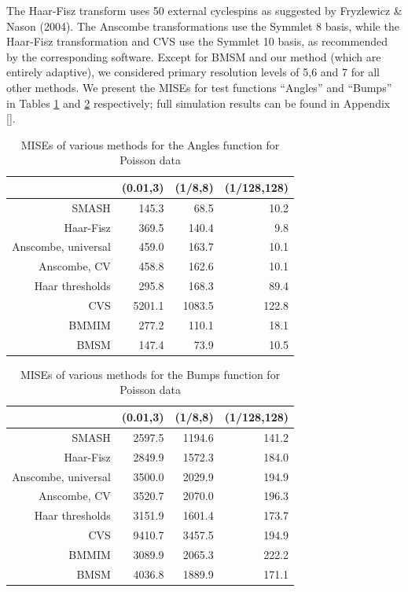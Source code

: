 \documentclass[12pt]{article}
\begin{document}
The Haar-Fisz transform uses 50 external cyclespins as suggested by Fryzlewicz \& Nason (2004). The Anscombe transformations use the Symmlet 8 basis, while the Haar-Fisz transformation and CVS use the Symmlet 10 basis, as recommended by the corresponding software. Except for BMSM and our method (which are entirely adaptive), we considered primary resolution levels of 5,6 and 7 for all other methods. We present the MISEs for test functions ``Angles'' and ``Bumps'' in Tables \ref{table:pois_angles} and \ref{table:pois_bumps} respectively; full simulation results can be found in Appendix \ref{}.\bigskip\\
\begin{table}[ht]
\centering
\begin{tabular}{rrrr}
  \hline
 & (0.01,3) & (1/8,8) & (1/128,128) \\
  \hline
SMASH & 145.3 & 68.5 & 10.2 \\
  Haar-Fisz & 369.5 & 140.4 & 9.8 \\
  Anscombe, universal & 459.0 & 163.7 & 10.1 \\
  Anscombe, CV & 458.8 & 162.6 & 10.1 \\
  Haar thresholds & 295.8 & 168.3 & 89.4 \\
  CVS & 5201.1 & 1083.5 & 122.8 \\
  BMMIM & 277.2 & 110.1 & 18.1 \\
  BMSM & 147.4 & 73.9 & 10.5 \\
   \hline
\end{tabular}
\caption{MISEs of various methods for the Angles function for Poisson data}
\label{table:pois_angles}
\end{table}

\begin{table}[ht]
\centering
\begin{tabular}{rrrr}
  \hline
 & (0.01,3) & (1/8,8) & (1/128,128) \\
  \hline
SMASH & 2597.5 & 1194.6 & 141.2 \\
  Haar-Fisz & 2849.9 & 1572.3 & 184.0 \\
  Anscombe, universal & 3500.0 & 2029.9 & 194.9 \\
  Anscombe, CV & 3520.7 & 2070.0 & 196.3 \\
  Haar thresholds & 3151.9 & 1601.4 & 173.7 \\
  CVS & 9410.7 & 3457.5 & 194.9 \\
  BMMIM & 3089.9 & 2065.3 & 222.2 \\
  BMSM & 4036.8 & 1889.9 & 171.1 \\
   \hline
\end{tabular}
\caption{MISEs of various methods for the Bumps function for Poisson data}
\label{table:pois_bumps}
\end{table}
\end{document}
